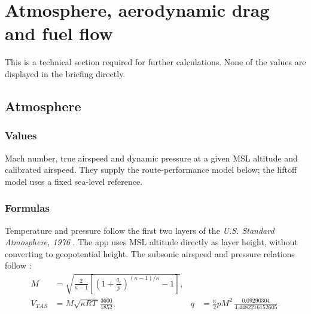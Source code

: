\documentclass[10pt,a4paper]{amsart}
\begin{document}
\section{Atmosphere, aerodynamic drag and fuel flow}\label{sec:flow}
This is a technical section required for further calculations. None of the values are displayed in the briefing directly.

\subsection{Atmosphere}\label{subsec:atmosphere}
\subsubsection*{Values}
Mach number, true airspeed and dynamic pressure at a given MSL altitude
and calibrated airspeed. They supply the route-performance model below;
the liftoff model uses a fixed sea-level reference.

\subsubsection*{Formulas}
Temperature and pressure follow the first two layers of the
\emph{U.S. Standard Atmosphere, 1976} \cite[Part~1]{ussa1976}.
The app uses MSL altitude directly as layer height, without converting
to geopotential height. The subsonic airspeed and pressure relations
follow \cite[eqs.~(1), (2), (5)--(7) and (12)]{aiken1946}:
\begin{align*}
 M&=\sqrt{\frac{2}{\kappa-1}
       \left[\left(1+\frac{q_c}{p}\right)^{(\kappa-1)/\kappa}-1\right]},\\
 V_{TAS}&=M\sqrt{\kappa RT}\,\frac{3600}{1852},&
 q&=\frac{\kappa}{2}pM^2\,\frac{0.09290304}{4.4482216152605}.
\end{align*}
\end{document}
